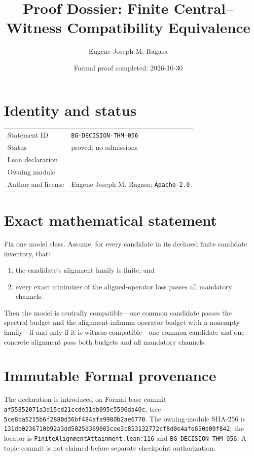 \documentclass[11pt]{article}
\title{Proof Dossier: Finite Central--Witness Compatibility Equivalence}
\author{Eugene Joseph M. Ragasa}
\date{Formal proof completed: 2026-10-30}
\begin{document}
\raggedright
\maketitle

\section{Identity and status}
\begin{tabularx}{\textwidth}{@{}lY@{}}
\toprule
Statement ID & \texttt{BG-DECISION-THM-056} \\
Status & proved; no admissions \\
Lean declaration &  \\
Owning module &  \\
Author and license & Eugene Joseph M. Ragasa; \texttt{Apache-2.0} \\
\bottomrule
\end{tabularx}

\section{Exact mathematical statement}
Fix one model class.  Assume, for every candidate in its declared finite candidate inventory, that:
\begin{enumerate}
\item the candidate's alignment family is finite; and
\item every exact minimizer of the aligned-operator loss passes all mandatory channels.
\end{enumerate}
Then the model is centrally compatible---one common candidate passes the spectral budget and the alignment-infimum operator budget with a nonempty family---if and only if it is witness-compatible---one common candidate and one concrete alignment pass both budgets and all mandatory channels.

\section{Immutable Formal provenance}
The declaration is introduced on Formal base commit
\texttt{af55852071a3d15cd21ccde31db095c5596da40c}, tree
\texttt{5ce8ba5215b6f2880d36bf484afa9980b2ae0770}.  The owning-module SHA-256 is
\texttt{131db0236710b92a3dd5025d369003cee3c853132772cf8d0e4afe650d00f842}; the locator is \texttt{FiniteAlignmentAttainment.lean:116} and \texttt{BG-DECISION-THM-056}.  A topic commit is not claimed before separate checkpoint authorization.
\end{document}
